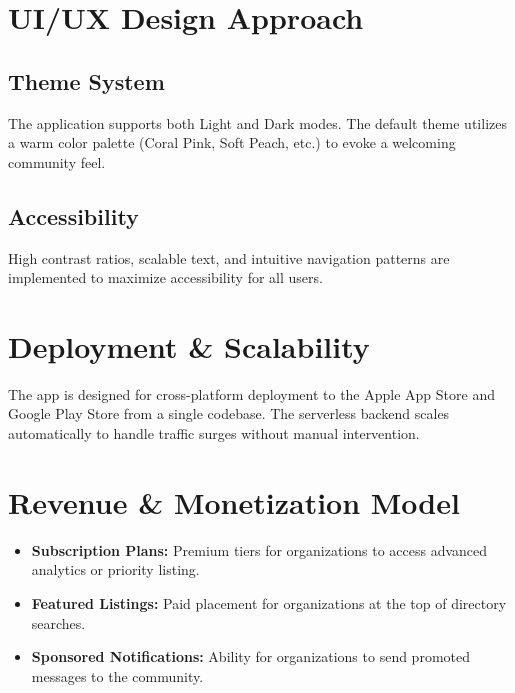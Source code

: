 \documentclass[12pt, a4paper]{report}
\begin{document}
\chapter{UI/UX Design Approach}

\section{Theme System}
The application supports both Light and Dark modes. The default theme utilizes a warm color palette (Coral Pink, Soft Peach, etc.) to evoke a welcoming community feel.

\section{Accessibility}
High contrast ratios, scalable text, and intuitive navigation patterns are implemented to maximize accessibility for all users.

\chapter{Deployment & Scalability}
The app is designed for cross-platform deployment to the Apple App Store and Google Play Store from a single codebase. The serverless backend scales automatically to handle traffic surges without manual intervention.

\chapter{Revenue & Monetization Model}
\begin{itemize}
    \item \textbf{Subscription Plans:} Premium tiers for organizations to access advanced analytics or priority listing.
    \item \textbf{Featured Listings:} Paid placement for organizations at the top of directory searches.
    \item \textbf{Sponsored Notifications:} Ability for organizations to send promoted messages to the community.
\end{itemize}
\end{document}
